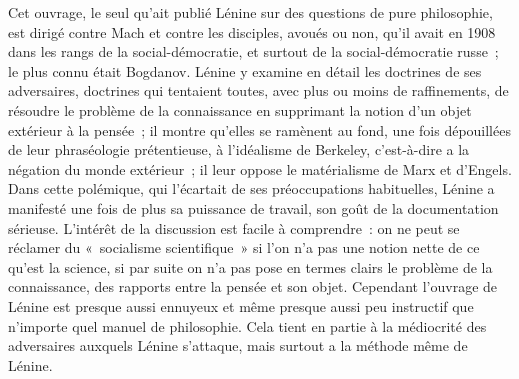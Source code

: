 \documentclass[french,twoside]{book} %
\begin{document}
\noindent \par
Cet ouvrage, le seul qu'ait publié Lénine sur des questions de pure philosophie, est dirigé contre Mach et contre les disciples, avoués ou non, qu'il avait en 1908 dans les rangs de la social-démocratie, et surtout de la social-démocratie russe ; le plus connu était Bogdanov. Lénine y examine en détail les doctrines de ses adversaires, doctrines qui tentaient toutes, avec plus ou moins de raffinements, de résoudre le problème de la connaissance en supprimant la notion d'un objet extérieur à la pensée ; il montre qu'elles se ramènent au fond, une fois dépouillées de leur phraséologie prétentieuse, à l'idéalisme de Berkeley, c'est-à-dire a la négation du monde extérieur ; il leur oppose le matérialisme de Marx et d'Engels. Dans cette polémique, qui l'écartait de ses préoccupations habituelles, Lénine a manifesté une fois de plus sa puissance de travail, son goût de la documentation sérieuse. L'intérêt de la discussion est facile à comprendre : on ne peut se réclamer du « socialisme scientifique » si l'on n'a pas une notion nette de ce qu'est la science, si par suite on n'a pas pose en termes clairs le problème de la connaissance, des rapports entre la pensée et son objet. Cependant l'ouvrage de Lénine est presque aussi ennuyeux et même presque aussi peu instructif que n'importe quel manuel de philosophie. Cela tient en partie à la médiocrité des adversaires auxquels Lénine s'attaque, mais surtout a la méthode même de Lénine.\par
\end{document}
